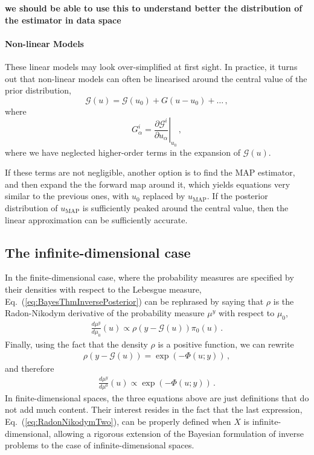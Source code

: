 {\bf we should be able to use this to understand better the distribution of the estimator in data space} 

\paragraph{Non-linear Models}

These linear models may look over-simplified at first sight. In practice, it
turns out that non-linear models can often be linearised around the central
value of the prior distribution, 
\begin{equation}
  \label{eq:LinU0}
  \mathcal{G}(u) = \mathcal{G}(u_0) + G \left(u - u_0\right) + \ldots\, ,
\end{equation}
where 
\begin{equation}
  \label{eq:FirstDerU0}
  G^i_\alpha = \left. \frac{\partial \mathcal{G}^i}{\partial u_\alpha} \right|_{u_0}\, ,
\end{equation}
where we have neglected higher-order terms in the expansion of $\mathcal{G}(u)$.

If these terms are not negligible, another option is to find the MAP estimator,
and then expand the the forward map around it, which yields equations very
similar to the previous ones, with $u_0$ replaced by $u_\mathrm{MAP}$. If the
posterior distribution of $u_\mathrm{MAP}$ is sufficiently peaked around the
central value, then the linear approximation can be sufficiently accurate. 


\subsection{The infinite-dimensional case}
\label{sec:infin-dimens-case}

In the finite-dimensional case, where the probability measures are specified by
their densities with respect to the Lebesgue measure,
Eq.~(\ref{eq:BayesThmInversePosterior}) can be rephrased by saying  that $\rho$
is the Radon-Nikodym derivative of the probability measure $\mu^y$ with respect
to $\mu_0$, \viz
\begin{align}
  \label{eq:RadonNikodym}
  \frac{d\mu^y}{d\mu_0} (u) \propto \rho(y-\mathcal G(u)) \pi_0(u)\, .
\end{align}
Finally, using the fact that the density $\rho$ is a positive
function, we can rewrite 
\begin{align}
  \label{eq:PotentialDef}
  \rho(y-\mathcal G(u)) = \exp\left(-\Phi(u;y)\right)\, ,
\end{align}
and therefore
\begin{align}
  \label{eq:RadonNikodymTwo}
  \frac{d\mu^y}{d\mu^0} (u) \propto \exp\left(-\Phi(u;y)\right)\, .
\end{align}
In finite-dimensional spaces, the three equations above are just definitions
that do not add much content. Their interest resides in the fact that the last
expression, Eq.~(\ref{eq:RadonNikodymTwo}), can be properly defined when $X$ is
infinite-dimensional, allowing a rigorous extension of the Bayesian formulation
of inverse problems to the case of infinite-dimensional spaces. 

